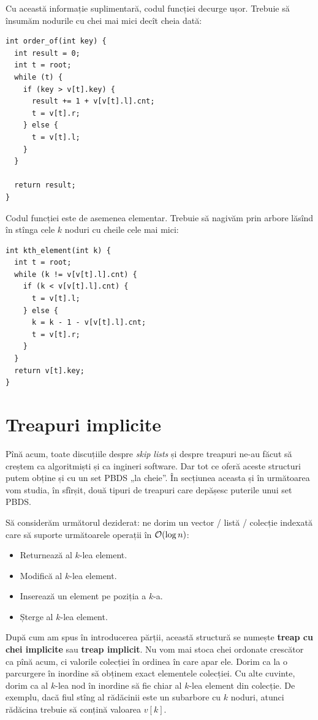 \documentclass[../main.tex]{subfiles}
\begin{document}
Cu această informație suplimentară, codul funcției  decurge ușor. Trebuie să însumăm nodurile cu chei mai mici decît cheia dată:

\begin{verbatim}
int order_of(int key) {
  int result = 0;
  int t = root;
  while (t) {
    if (key > v[t].key) {
      result += 1 + v[v[t].l].cnt;
      t = v[t].r;
    } else {
      t = v[t].l;
    }
  }

  return result;
}
\end{verbatim}

Codul funcției  este de asemenea elementar. Trebuie să nagivăm prin arbore lăsînd în stînga cele $k$ noduri cu cheile cele mai mici:

\begin{verbatim}
int kth_element(int k) {
  int t = root;
  while (k != v[v[t].l].cnt) {
    if (k < v[v[t].l].cnt) {
      t = v[t].l;
    } else {
      k = k - 1 - v[v[t].l].cnt;
      t = v[t].r;
    }
  }
  return v[t].key;
}
\end{verbatim}


\section{Treapuri implicite}

Pînă acum, toate discuțiile despre \textit{skip lists} și despre treapuri ne-au făcut să creștem ca algoritmiști și ca ingineri software. Dar tot ce oferă aceste structuri putem obține și cu un set PBDS „la cheie”. În secțiunea aceasta și în următoarea vom studia, în sfîrșit, două tipuri de treapuri care depășesc puterile unui set PBDS.

Să considerăm următorul deziderat: ne dorim un vector / listă / colecție indexată care să suporte următoarele operații în $\mathcal{O}(\log n)$:

\begin{itemize}
  \item Returnează al $k$-lea element.
  \item Modifică al $k$-lea element.
  \item Inserează un element pe poziția a $k$-a.
  \item Șterge al $k$-lea element.
\end{itemize}

După cum am spus în introducerea părții, această structură se numește \textbf{treap cu chei implicite} sau \textbf{treap implicit}. Nu vom mai stoca chei ordonate crescător ca pînă acum, ci valorile colecției în ordinea în care apar ele. Dorim ca la o parcurgere în inordine să obținem exact elementele colecției. Cu alte cuvinte, dorim ca al $k$-lea nod în inordine să fie chiar al $k$-lea element din colecție. De exemplu, dacă fiul stîng al rădăcinii este un subarbore cu $k$ noduri, atunci rădăcina trebuie să conțină valoarea $v[k]$.
\end{document}
